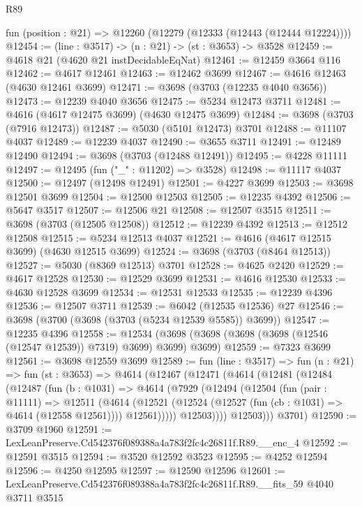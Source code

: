 \begin{lexlean}{R89}
\begin{coremodule}
  fun (position : @21) => @12260 (@12279 (@12333 (@12443 (@12444 @12224))))
@12454 := (line : @3517) -> (n : @21) -> (st : @3653) -> @3528
@12459 := @4618 @21 (@4620 @21 instDecidableEqNat)
@12461 := @12459 @3664 @116
@12462 := @4617 @12461
@12463 := @12462 @3699
@12467 := @4616 @12463 (@4630 @12461 @3699)
@12471 := @3698 (@3703 (@12235 @4040 @3656))
@12473 := @12239 @4040 @3656
@12475 := @5234 @12473 @3711
@12481 := @4616 (@4617 @12475 @3699) (@4630 @12475 @3699)
@12484 := @3698 (@3703 (@7916 @12473))
@12487 := @5030 (@5101 @12473) @3701
@12488 := @11107 @4037
@12489 := @12239 @4037
@12490 := @3655 @3711
@12491 := @12489 @12490
@12494 := @3698 (@3703 (@12488 @12491))
@12495 := @4228 @11111
@12497 := @12495 (fun ("_" : @11202) => @3528)
@12498 := @11117 @4037
@12500 := @12497 (@12498 @12491)
@12501 := @4227 @3699
@12503 := @3698 @12501 @3699
@12504 := @12500 @12503
@12505 := @12235 @4392
@12506 := @5647 @3517
@12507 := @12506 @21
@12508 := @12507 @3515
@12511 := @3698 (@3703 (@12505 @12508))
@12512 := @12239 @4392
@12513 := @12512 @12508
@12515 := @5234 @12513 @4037
@12521 := @4616 (@4617 @12515 @3699) (@4630 @12515 @3699)
@12524 := @3698 (@3703 (@8464 @12513))
@12527 := @5030 (@8369 @12513) @3701
@12528 := @4625 @2420
@12529 := @4617 @12528
@12530 := @12529 @3699
@12531 := @4616 @12530
@12533 := @4630 @12528 @3699
@12534 := @12531 @12533
@12535 := @12239 @4396
@12536 := @12507 @3711
@12539 := @6042 (@12535 @12536) @27
@12546 := @3698 (@3700 (@3698 (@3703 (@5234 @12539 @5585)) @3699))
@12547 := @12235 @4396
@12558 := @12534 (@3698 (@3698 (@3698 (@3698 (@12546 (@12547 @12539)) @7319) @3699) @3699) @3699)
@12559 := @7323 @3699
@12561 := @3698 @12559 @3699
@12589 := fun (line : @3517) =>
  fun (n : @21) =>
  fun (st : @3653) =>
  @4614
    (@12467
      (@12471
        (@4614
          (@12481
            (@12484
              (@12487
                (fun (b : @1031) =>
                @4614
                  (@7929
                    (@12494
                      (@12504
                        (fun (pair : @11111) =>
                        @12511
                          (@4614
                            (@12521
                              (@12524 (@12527 (fun (cb : @1031) => @4614 (@12558 @12561))))
                              @12561)))))
                    @12503))))
            @12503)))
      @3701)
@12590 := @3709 @1960
@12591 := LexLeanPreserve.Cd542376f089388a4a783f2fc4c26811f.R89.__enc_4
@12592 := @12591 @3515
@12594 := @3520 @12592 @3523
@12595 := @4252 @12594
@12596 := @4250 @12595
@12597 := @12590 @12596
@12601 := LexLeanPreserve.Cd542376f089388a4a783f2fc4c26811f.R89.__fits_59 @4040 @3711 @3515

\end{coremodule}
\end{lexlean}
